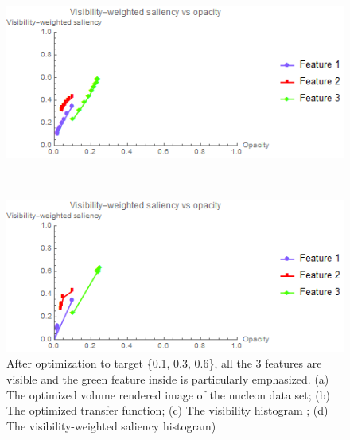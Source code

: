 \begin{figure}
	\begin{minipage}{.49\textwidth}
		\includegraphics[width=1\linewidth]{images/nucleon_naive_saliencyopacity_fixed}
		\subcaption{}
	\end{minipage}~
	\begin{minipage}{.49\textwidth}
		\includegraphics[width=1\linewidth]{images/nucleon_naive_saliencyopacity_parallelsearch}
		\subcaption{}
	\end{minipage}
	\caption{After optimization to target \{0.1, 0.3, 0.6\}, all the 3 features are visible and the green feature inside is particularly emphasized. (a) The optimized volume rendered image of the nucleon data set; (b) The optimized transfer function; (c) The visibility histogram \cite{wang_efficient_2011}; (d) The visibility-weighted saliency histogram)}
	\label{fig:nucleon_naive_optimized}
\end{figure}

